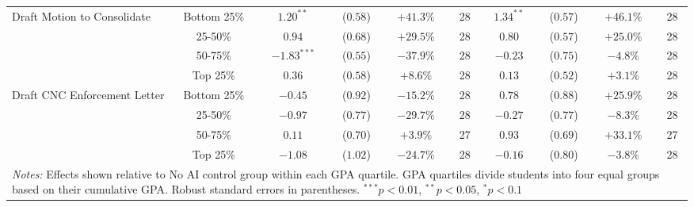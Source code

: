 \begin{table}[!htbp]
\begin{tabular}{lccccccccc}
\hline
\multirow{4}{*}{Draft Motion to Consolidate} & Bottom 25\% & $1.20^{**}$ & ($0.58$) & $+41.3\%$ & 28 & $1.34^{**}$ & ($0.57$) & $+46.1\%$ & 28 \\
& 25-50\% & $0.94$ & ($0.68$) & $+29.5\%$ & 28 & $0.80$ & ($0.57$) & $+25.0\%$ & 28 \\
& 50-75\% & $-1.83^{***}$ & ($0.55$) & $-37.9\%$ & 28 & $-0.23$ & ($0.75$) & $-4.8\%$ & 28 \\
& Top 25\% & $0.36$ & ($0.58$) & $+8.6\%$ & 28 & $0.13$ & ($0.52$) & $+3.1\%$ & 28 \\
\hline
\multirow{4}{*}{Draft CNC Enforcement Letter} & Bottom 25\% & $-0.45$ & ($0.92$) & $-15.2\%$ & 28 & $0.78$ & ($0.88$) & $+25.9\%$ & 28 \\
& 25-50\% & $-0.97$ & ($0.77$) & $-29.7\%$ & 28 & $-0.27$ & ($0.77$) & $-8.3\%$ & 28 \\
& 50-75\% & $0.11$ & ($0.70$) & $+3.9\%$ & 27 & $0.93$ & ($0.69$) & $+33.1\%$ & 27 \\
& Top 25\% & $-1.08$ & ($1.02$) & $-24.7\%$ & 28 & $-0.16$ & ($0.80$) & $-3.8\%$ & 28 \\
\hline
\multicolumn{10}{p{0.95\linewidth}}{\footnotesize \textit{Notes:} Effects shown relative to No AI control group within each GPA quartile. GPA quartiles divide students into four equal groups based on their cumulative GPA. Robust standard errors in parentheses. $^{***}p<0.01$, $^{**}p<0.05$, $^{*}p<0.1$}
\end{tabular}
\end{table}
